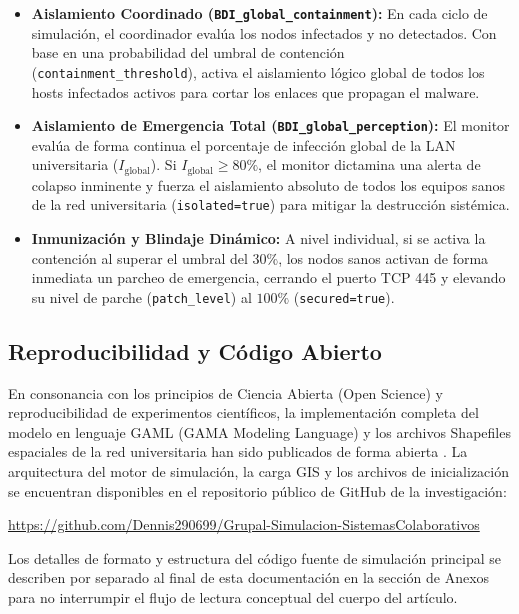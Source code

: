 \begin{itemize}
    \item \textbf{Aislamiento Coordinado (\texttt{BDI\_global\_}\allowbreak\texttt{containment}):} En cada ciclo de simulación, el coordinador evalúa los nodos infectados y no detectados. Con base en una probabilidad del umbral de contención (\texttt{containment\_}\allowbreak\texttt{threshold}), activa el aislamiento lógico global de todos los hosts infectados activos para cortar los enlaces que propagan el malware.
    \item \textbf{Aislamiento de Emergencia Total (\texttt{BDI\_global\_}\allowbreak\texttt{perception}):} El monitor evalúa de forma continua el porcentaje de infección global de la LAN universitaria ($I_{\text{global}}$). Si $I_{\text{global}} \geq 80\%$, el monitor dictamina una alerta de colapso inminente y fuerza el aislamiento absoluto de todos los equipos sanos de la red universitaria (\texttt{isolated}\allowbreak\texttt{=}\allowbreak\texttt{true}) para mitigar la destrucción sistémica.
    \item \textbf{Inmunización y Blindaje Dinámico:} A nivel individual, si se activa la contención al superar el umbral del $30\%$, los nodos sanos activan de forma inmediata un parcheo de emergencia, cerrando el puerto TCP 445 y elevando su nivel de parche (\texttt{patch\_}\allowbreak\texttt{level}) al $100\%$ (\texttt{secured}\allowbreak\texttt{=}\allowbreak\texttt{true}).
\end{itemize}

\subsection{Reproducibilidad y Código Abierto}
En consonancia con los principios de Ciencia Abierta (Open Science) y reproducibilidad de experimentos científicos, la implementación completa del modelo en lenguaje GAML (GAMA Modeling Language) y los archivos Shapefiles espaciales de la red universitaria han sido publicados de forma abierta \cite{taillandier2019gama}. La arquitectura del motor de simulación, la carga GIS y los archivos de inicialización se encuentran disponibles en el repositorio público de GitHub de la investigación:

\begin{center}
    \url{https://github.com/Dennis290699/Grupal-Simulacion-SistemasColaborativos}
\end{center}

Los detalles de formato y estructura del código fuente de simulación principal se describen por separado al final de esta documentación en la sección de Anexos para no interrumpir el flujo de lectura conceptual del cuerpo del artículo.
